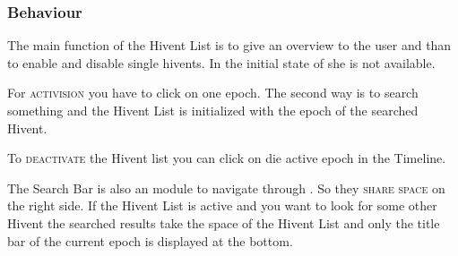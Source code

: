\subsubsection{Behaviour} %
\label{ssub:behaviour_hl}
The main function of the Hivent List is to give an overview to the user and than to enable and disable single hivents. In the initial state of she is not available. 

For \textsc{activision} you have to click on one epoch. The second way is to search something and the Hivent List is initialized with the epoch of the searched Hivent.

To \textsc{deactivate} the Hivent list you can click on die active epoch in the Timeline.

The Search Bar is also an module to navigate through \HG. So they \textsc{share space} on the right side. If the Hivent List is active and you want to look for some other Hivent the searched results take the space of the Hivent List and only the title bar of the current epoch is displayed at the bottom.

